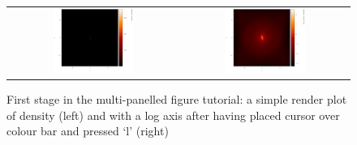 \documentclass[a4paper,10pt]{article}
\begin{document}
\begin{figure}[h]
\begin{center}
\begin{tabular}{cc}
\includegraphics[width=0.5\textwidth]{multipart1.png} &
\includegraphics[width=0.5\textwidth]{multipart2.png}
\end{tabular}
\caption{First stage in the multi-panelled figure tutorial: a simple render plot of density (left) and with a log axis after having placed cursor over colour bar and pressed `l' (right)}
\label{fig:multipart1}
\end{center}
\end{figure}
\end{document}
